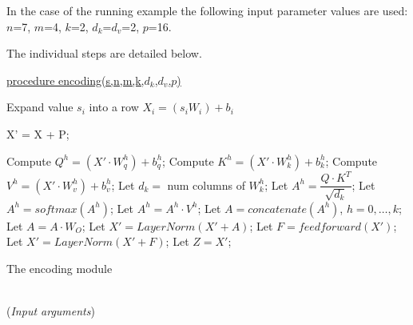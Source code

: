 \documentclass[algorithms,article,submit,pdftex,moreauthors]{Definitions/mdpi}
\begin{document}
In the case of the running example the following input parameter values are used: $n$=7, $m$=4, $k$=2, $d_k$=$d_v$=2, $p$=16.

The individual steps are detailed below.

\begin{algorithm2e}

	\underline{procedure encoding(s,n,m,k,$d_k$,$d_v$,$p$)} \label{algo:encoding}
	
	
	{\label{enc:seca1}
	   Expand value $s_i$ into a row $X_i = (s_iW_i) + b_i$
	}   \label{enc:seca2}
	
	X' = X + P;  \label{enc:positional}
        
	{ \label{enc:encoding-block1}
            {	\label{enc:multihead1}
                Compute $Q^h=(X'\cdot W_q^h) + b_q^h$;\; \label{enc:qh}
                Compute $K^h=(X'\cdot W_k^h) + b_k^h$;\; \label{enc:kh}
                Compute $V^h=(X'\cdot W_v^h) + b_v^h$;\; \label{enc:vh}
                Let $d_k=$ num columns of $W^h_k$;\; \label{enc:dk}
                Let $A^h = \dfrac{Q \cdot K^T}{\sqrt{d_k}}$;  \label{enc:attention1}
                Let $A^h = softmax\left(A^h\right)$;  \label{enc:softmax}
                Let $A^h = A^h\cdot V^h$;  \label{enc:attention2}
            } \label{enc:multihead2}
            Let $A=concatenate(A^h)$, $h=0,\dots,k$;\; \label{enc:concatenation}
            Let $A = A \cdot W_O$;  \label{enc:outproj} 
            Let $X' = LayerNorm(X' + A)$;\; \label{enc:addnorm1}
            Let $F = feedforward(X')$;  \label{enc:ffn}
            Let $X' = LayerNorm(X' + F)$;\; \label{enc:addnorm2}
        }   \label{enc:encoding-block2}                  
        Let $Z = X'$; \label{enc:output}
	\caption{The encoding module}
\end{algorithm2e}

~\\(\textit{Input arguments})
\end{document}
